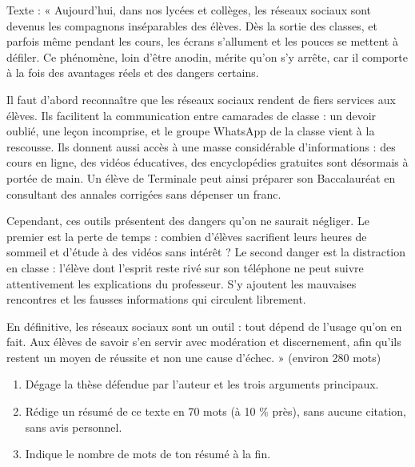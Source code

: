 \documentclass[11pt]{article}
\begin{document}
\begin{exercice}
Texte : « Aujourd'hui, dans nos lycées et collèges, les réseaux sociaux sont devenus les compagnons inséparables des élèves. Dès la sortie des classes, et parfois même pendant les cours, les écrans s'allument et les pouces se mettent à défiler. Ce phénomène, loin d'être anodin, mérite qu'on s'y arrête, car il comporte à la fois des avantages réels et des dangers certains.

Il faut d'abord reconnaître que les réseaux sociaux rendent de fiers services aux élèves. Ils facilitent la communication entre camarades de classe : un devoir oublié, une leçon incomprise, et le groupe WhatsApp de la classe vient à la rescousse. Ils donnent aussi accès à une masse considérable d'informations : des cours en ligne, des vidéos éducatives, des encyclopédies gratuites sont désormais à portée de main. Un élève de Terminale peut ainsi préparer son Baccalauréat en consultant des annales corrigées sans dépenser un franc.

Cependant, ces outils présentent des dangers qu'on ne saurait négliger. Le premier est la perte de temps : combien d'élèves sacrifient leurs heures de sommeil et d'étude à des vidéos sans intérêt ? Le second danger est la distraction en classe : l'élève dont l'esprit reste rivé sur son téléphone ne peut suivre attentivement les explications du professeur. S'y ajoutent les mauvaises rencontres et les fausses informations qui circulent librement.

En définitive, les réseaux sociaux sont un outil : tout dépend de l'usage qu'on en fait. Aux élèves de savoir s'en servir avec modération et discernement, afin qu'ils restent un moyen de réussite et non une cause d'échec. » (environ 280 mots)
\begin{enumerate}
\item Dégage la thèse défendue par l'auteur et les trois arguments principaux.
\item Rédige un résumé de ce texte en 70 mots (à 10 \% près), sans aucune citation, sans avis personnel.
\item Indique le nombre de mots de ton résumé à la fin.
\end{enumerate}
\end{exercice}
\end{document}
